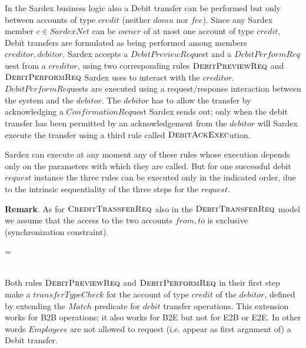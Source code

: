 In the Sardex business logic also a Debit transfer can be performed but only between accounts of type $credit$ (neither $domu$ nor $fee$). Since any Sardex member $c \in SardexNet$ can be $owner$ of at most one account of type $credit$, Debit transfers are formulated as being performed among members $creditor,debitor$. Sardex accepts a $DebitPreviewReq$uest and a  $DebitPerformReq$uest from a $creditor$, using two corresponding rules $\hbox{\sc DebitPreviewReq}$ and $\hbox{\sc DebitPerformReq}$ Sardex uses to interact with the $creditor$.  $DebitPerformReq$uests are executed using a request/response interaction between the system and the $debitor$. The $debitor$ has to allow the transfer by acknowledging a $ConfirmationReq$uest Sardex sends out; only when the debit transfer has been permitted by an acknowledgement from the $debitor$ will Sardex execute the transfer using a third rule called $\hbox{\sc DebitAckExec}$ution. 

Sardex can execute at any moment any of these rules whose execution depends only on the parameters with which they are called. But for one successful debit $request$ instance the three rules can be executed only in the indicated order, due to the intrinsic sequentiality of the three steps for the $request$.

{\bf Remark}. As for $\hbox{\sc CreditTransferReq}$ also in the $\hbox{\sc DebitTransferReq}$ model we assume that the access to the two accounts $from, to$ is exclusive (synchronization constraint). 


\begin{asm}
=\+
    \\
    \\
\end{asm}


Both rules $\hbox{\sc DebitPreviewReq}$ and $\hbox{\sc DebitPerformReq}$ in their first step make a $transferTypeCheck$ for the account of type $credit$ of the $debitor$, defined by extending the $Match$ predicate for $debit$ transfer operations. This extension works for B2B operations; it also works for B2E but not for E2B or E2E. In other words $Employee$s are not allowed to request (i.e. appear as first argument of) a Debit transfer.

